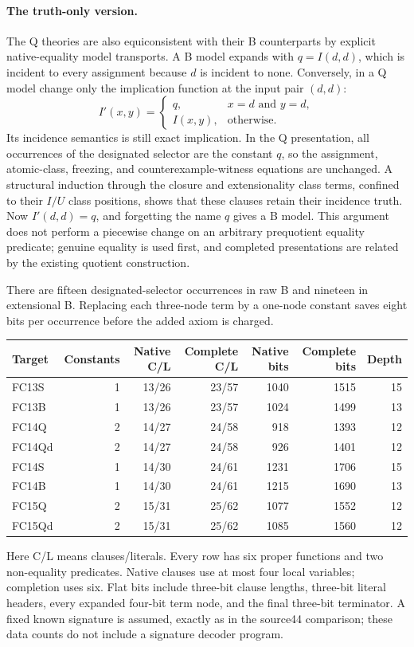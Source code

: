 \paragraph{The truth-only version.}
The Q theories are also equiconsistent with their B counterparts by explicit
native-equality model transports.  A B model expands with $q=I(d,d)$, which is
incident to every assignment because $d$ is incident to none.  Conversely,
in a Q model change only the implication function at the input pair $(d,d)$:
\[
 I'(x,y)=
 \begin{cases}q,&x=d\text{ and }y=d,\\ I(x,y),&\text{otherwise.}\end{cases}
\]
Its incidence semantics is still exact implication.  In the Q presentation,
all occurrences of the designated selector are the constant $q$, so the
assignment, atomic-class, freezing, and counterexample-witness equations are
unchanged.  A structural induction through the closure and extensionality
class terms, confined to their $I/U$ class positions, shows that these clauses
retain their incidence truth.  Now $I'(d,d)=q$, and forgetting the name $q$
gives a B model.  This argument does not perform a piecewise change on an
arbitrary prequotient equality predicate; genuine equality is used first, and
completed presentations are related by the existing quotient construction.

There are fifteen designated-selector occurrences in raw B and nineteen in
extensional B.  Replacing each three-node term by a one-node constant saves
eight bits per occurrence before the added axiom is charged.

\begin{center}
\begin{tabular}{lrrrrrr}
\toprule
Target & Constants & Native C/L & Complete C/L & Native bits & Complete bits & Depth\\
\midrule
FC13S &1&13/26&23/57&1040&1515&15\\
FC13B &1&13/26&23/57&1024&1499&13\\
FC14Q &2&14/27&24/58&918&1393&12\\
FC14Qd&2&14/27&24/58&926&1401&12\\
\midrule
FC14S &1&14/30&24/61&1231&1706&15\\
FC14B &1&14/30&24/61&1215&1690&13\\
FC15Q &2&15/31&25/62&1077&1552&12\\
FC15Qd&2&15/31&25/62&1085&1560&12\\
\bottomrule
\end{tabular}
\end{center}
Here C/L means clauses/literals.  Every row has six proper functions and two
non-equality predicates.  Native clauses use at most four local variables;
completion uses six.  Flat bits include three-bit clause lengths, three-bit
literal headers, every expanded four-bit term node, and the final three-bit
terminator.  A fixed known signature is assumed, exactly as in the source44
comparison; these data counts do not include a signature decoder program.

